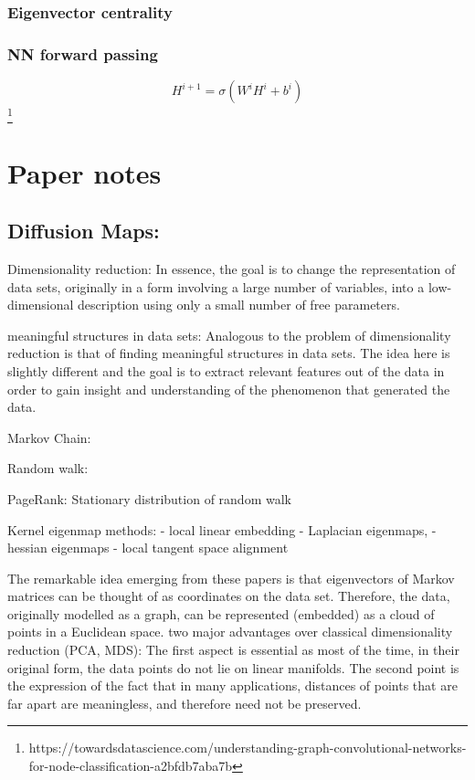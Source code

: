 \subsection{Eigenvector centrality}
\subsection{NN forward passing}
\begin{equation}
    H^{i + 1} = \sigma ( W^i H ^i + b^i) 
\end{equation}
\footnote{https://towardsdatascience.com/understanding-graph-convolutional-networks-for-node-classification-a2bfdb7aba7b}

\chapter{Paper notes}

\section{Diffusion Maps:}
\citet{diffusionMaps}
\cite{diffusionMaps}

Dimensionality reduction:
In essence, the goal is to change the representation of data sets, originally in a form involving a large number of variables, into a
low-dimensional description using only a small number of free parameters.

meaningful structures in data sets:
Analogous to the problem of dimensionality reduction is that of finding meaningful structures in data sets. The idea here is slightly
different and the goal is to extract relevant features out of the data in order to gain insight and understanding of the
phenomenon that generated the data.

Markov Chain:

Random walk:

PageRank:
Stationary distribution of random walk

Kernel eigenmap methods:
- local linear embedding
- Laplacian eigenmaps,
- hessian eigenmaps
- local tangent space alignment

The remarkable idea emerging from these papers is that eigenvectors of Markov matrices can be thought of as coordinates
on the data set. Therefore, the data, originally modelled as a graph, can be represented (embedded) as a cloud of points
in a Euclidean space.
two major advantages over classical dimensionality reduction (PCA, MDS):
The first aspect is essential as most of the time, in their original form, the data points do not lie on
 linear manifolds.
 The second point is the expression of the fact that in many
applications, distances of points that are far apart are meaningless, and therefore need not be preserved.

